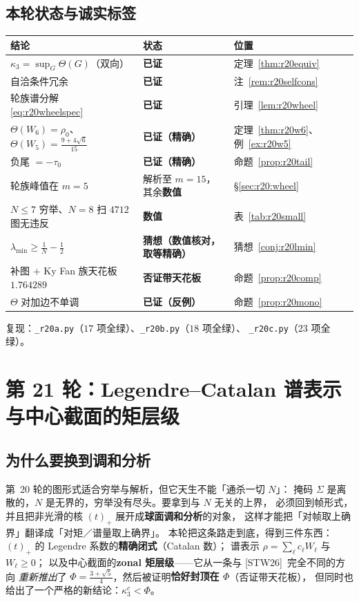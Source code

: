 \documentclass[UTF8,11pt]{ctexart}
\theoremstyle{definition}
\newcommand{\STW}{\textup{[STW26]}}
\begin{document}
\subsection{本轮状态与诚实标签}\label{sec:r20:status}

\begin{center}\small
\begin{tabular}{lll}
\toprule
结论 & 状态 & 位置\\
\midrule
$\kappa_3=\sup_G\Theta(G)$（双向） & \textbf{已证} & 定理~\ref{thm:r20equiv}\\
自洽条件冗余 & \textbf{已证} & 注~\ref{rem:r20selfcons}\\
轮族谱分解 \eqref{eq:r20wheelspec} & \textbf{已证} & 引理~\ref{lem:r20wheel}\\
$\Theta(W_6)=\rho_0$、$\Theta(W_5)=\frac{9+4\sqrt6}{15}$ & \textbf{已证（精确）} & 定理~\ref{thm:r20w6}、例~\ref{ex:r20w5}\\
负尾 $=-\tau_0$ & \textbf{已证（精确）} & 命题~\ref{prop:r20tail}\\
轮族峰值在 $m=5$ & 解析至 $m=15$，其余\textbf{数值} & \S\ref{sec:r20:wheel}\\
$N\le7$ 穷举、$N=8$ 扫 $4712$ 图无违反 & \textbf{数值} & 表~\ref{tab:r20small}\\
$\lambda_{\min}\ge\frac1N-\frac12$ & \textbf{猜想（数值核对，取等精确）} & 猜想~\ref{conj:r20lmin}\\
补图 $+$ Ky Fan 族天花板 $1.764289$ & \textbf{否证带天花板} & 命题~\ref{prop:r20comp}\\
$\Theta$ 对加边不单调 & \textbf{已证（反例）} & 命题~\ref{prop:r20mono}\\
\bottomrule
\end{tabular}
\end{center}

复现：\texttt{\_r20a.py}（$17$ 项全绿）、\texttt{\_r20b.py}（$18$ 项全绿）、
\texttt{\_r20c.py}（$23$ 项全绿）。

\section{第 21 轮：Legendre--Catalan 谱表示与中心截面的矩层级}\label{sec:r21}

\subsection{为什么要换到调和分析}\label{sec:r21:motiv}

第~20 轮的图形式适合穷举与解析，但它天生不能「通杀一切 $N$」：
掩码 $\Sigma$ 是离散的，$N$ 是无界的，穷举没有尽头。要拿到与 $N$ 无关的上界，
必须回到帧形式，并且把非光滑的核 $(t)_+$ 展开成\textbf{球面调和分析}的对象，
这样才能把「对帧取上确界」翻译成「对矩／谱量取上确界」。
本轮把这条路走到底，得到三件东西：
$(t)_+$ 的 Legendre 系数的\textbf{精确闭式}（Catalan 数）；
谱表示 $\rho=\sum_\ell c_\ell W_\ell$ 与 $W_\ell\ge0$；
以及中心截面的\textbf{zonal 矩层级}——它从一条与 \STW~完全不同的方向
\emph{重新推出}了 $\Phi=\frac{3+\sqrt5}4$，然后被证明\textbf{恰好封顶在 $\Phi$}（否证带天花板），
但同时也给出了一个严格的新结论：$\kappa_3^c<\Phi$。
\end{document}
